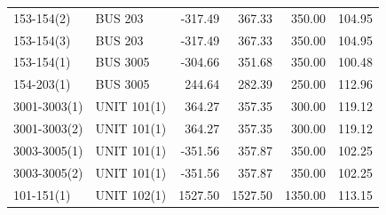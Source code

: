 \documentclass[10pt]{report}
\begin{document}
\begin{table}[H]
{\begin{tabular}{llrrrr}
153-154(2) & BUS 203 & -317.49 & 367.33 & 350.00 & 104.95 \\
153-154(3) & BUS 203 & -317.49 & 367.33 & 350.00 & 104.95 \\
153-154(1) & BUS 3005 & -304.66 & 351.68 & 350.00 & 100.48 \\
154-203(1) & BUS 3005 & 244.64 & 282.39 & 250.00 & 112.96 \\
3001-3003(1) & UNIT 101(1) & 364.27 & 357.35 & 300.00 & 119.12 \\
3001-3003(2) & UNIT 101(1) & 364.27 & 357.35 & 300.00 & 119.12 \\
3003-3005(1) & UNIT 101(1) & -351.56 & 357.87 & 350.00 & 102.25 \\
3003-3005(2) & UNIT 101(1) & -351.56 & 357.87 & 350.00 & 102.25 \\
101-151(1) & UNIT 102(1) & 1527.50 & 1527.50 & 1350.00 & 113.15 \\
\bottomrule
\end{tabular}}
\end{table}
\end{document}
